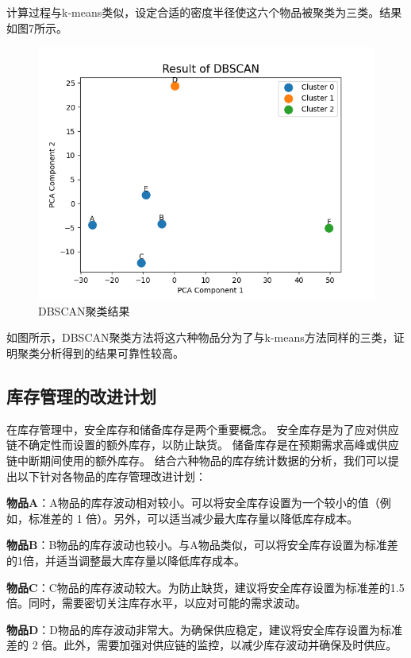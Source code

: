 \documentclass[12pt,a4paper]{article}
\begin{document}
计算过程与k-means类似，设定合适的密度半径使这六个物品被聚类为三类。结果如图7所示。
\begin{figure}[ht]
    \centering
    \includegraphics[scale=0.9]{fig7.png}
    \caption{DBSCAN聚类结果}
    \label{fig:7}
\end{figure}

如图所示，DBSCAN聚类方法将这六种物品分为了与k-means方法同样的三类，证明聚类分析得到的结果可靠性较高。

\subsection{库存管理的改进计划}
在库存管理中，安全库存和储备库存是两个重要概念。
安全库存是为了应对供应链不确定性而设置的额外库存，以防止缺货。
储备库存是在预期需求高峰或供应链中断期间使用的额外库存。
结合六种物品的库存统计数据的分析，我们可以提出以下针对各物品的库存管理改进计划：

\textbf{物品A}：A物品的库存波动相对较小。可以将安全库存设置为一个较小的值（例如，标准差的 1 倍）。另外，可以适当减少最大库存量以降低库存成本。

\textbf{物品B}：B物品的库存波动也较小。与A物品类似，可以将安全库存设置为标准差的1倍，并适当调整最大库存量以降低库存成本。

\textbf{物品C}：C物品的库存波动较大。为防止缺货，建议将安全库存设置为标准差的1.5倍。同时，需要密切关注库存水平，以应对可能的需求波动。

\textbf{物品D}：D物品的库存波动非常大。为确保供应稳定，建议将安全库存设置为标准差的 2 倍。此外，需要加强对供应链的监控，以减少库存波动并确保及时供应。
\end{document}
